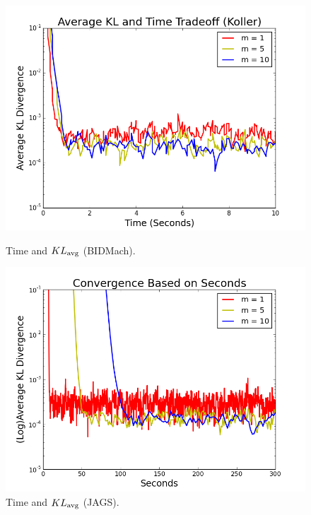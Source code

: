 \documentclass{article} %
\begin{document}
\begin{figure}[t]
  \centering
  \begin{minipage}{.5\textwidth}
    \centering
    \includegraphics[width=1\textwidth]{fig_kl_time_tradeoff_koller_data}
    \caption{Time and $KL_{\rm avg}$ (BIDMach).}
    \label{fig:kl_time_bidmach}
  \end{minipage}\hfill
    \begin{minipage}{.5\textwidth}
    \centering
    \includegraphics[width=1\textwidth]{fig_kl_div_25_50_perc_jags_time}
    \caption{Time and $KL_{\rm avg}$ (JAGS).}
    \label{fig:kl_time_jags}
  \end{minipage}
\end{figure}
\end{document}
